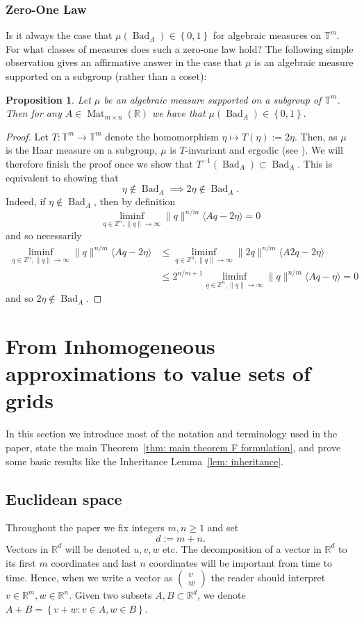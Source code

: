 \documentclass[reqno,11pt, twoside]{amsart}
\theoremstyle{plain}
\newtheorem{prop}[thm]{Proposition}
\theoremstyle{definition}
\theoremstyle{definition}
\theoremstyle{remark}
\numberwithin{equation}{section}
\newcommand{\bR}{\mathbb{R}}
\newcommand{\bZ}{\mathbb{Z}}
\newcommand{\bT}{\mathbb{T}}
\newcommand\norm[1]{\|#1\|}
\newcommand\seta[1]{\left\{#1\right\}}
\newcommand\pa[1]{\left(#1\right)}
\newcommand\idist[1]{\langle#1\rangle}
\newcommand\on[1]{\operatorname{#1}}
\newcommand\smallmat[1]{\pa{\begin{smallmatrix}#1\end{smallmatrix}}}
\begin{document}
\subsubsection*{Zero-One Law} Is it always the case that $\mu(\on{Bad}_A)\in \seta{0,1}$ for algebraic measures on $\bT^m.$ For what classes of measures 
does such a zero-one law hold? The following simple observation gives 
an affirmative answer in the case that $\mu$ is an algebraic measure supported on a subgroup (rather than a coset):
\begin{prop}
    Let $\mu$ be an algebraic measure supported on a subgroup of 
    $\bT^m$. Then for any $A\in \on{Mat}_{m\times n}(\bR)$ we have 
    that $\mu(\on{Bad}_A)\in \seta{0,1}.$
\end{prop}
\begin{proof}
    Let $T:\bT^m\to \bT^m$ denote the homomorphism $\eta\mapsto T(\eta):=2\eta.$ Then, as $\mu$ is the Haar measure on a subgroup, $\mu$ is $T$-invariant and ergodic (see \cite[Corollary 2.20]{EW}).
    We will therefore finish the proof once we show that $T^{-1}(\on{Bad}_A)\subset \on{Bad}_A$. This is equivalent to showing that  
    $$\eta\notin \on{Bad}_A \implies 2\eta\notin\on{Bad}_A.$$ Indeed, if $\eta\notin\on{Bad}_A$, then by definition
    $$\liminf_{q\in \bZ^n,\norm{q}\to\infty}\norm{q}^{n/m}\idist{Aq-2\eta}=0$$
    and so necessarily 
    \begin{align*}
    \liminf_{q\in \bZ^n,\norm{q}\to\infty}\norm{q}^{n/m}
    \idist{Aq-2\eta}&\le
    \liminf_{q\in \bZ^n,\norm{q}\to\infty}\norm{2q}^{n/m}\idist{A2q-2\eta} \\
    &\le 2^{n/m+1}\liminf_{q\in \bZ^n,\norm{q}\to\infty}\norm{q}^{n/m}\idist{Aq-\eta}=0 
    \end{align*}
    and so $2\eta\notin \on{Bad}_A$.
\end{proof}


\section{From Inhomogeneous approximations to value sets of grids}
In this section we introduce most of the notation and terminology used in the paper, state the main Theorem~\ref{thm: main theorem F formulation}, and prove some basic results like the Inheritance Lemma~\ref{lem: inheritance}.

\subsection{Euclidean space}
Throughout the paper we fix integers $m,n\ge 1$ and set 
$$d:=m+n.$$ 
Vectors in $\bR^d$ will be denoted $u,v,w$ etc. The decomposition of a vector in $\bR^d$ to its first $m$ coordinates and last $n$ coordinates will be important from time to time. Hence, when we write a vector as $ \smallmat{v\\w}$ the reader should interpret $v\in \bR^m, w\in \bR^n$.
Given two subsets $A,B\subset \bR^d$, we denote $A+B = \seta{v+w:v\in A, w\in B}$.
\end{document}
